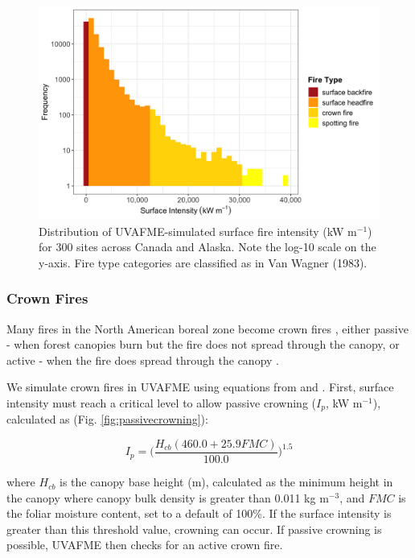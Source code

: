 \documentclass[a4paper, 12pt] {report}
\begin{document}
\begin{figure} 
	\includegraphics[width=\linewidth]{figures/Isurfhist.png}
	\caption{Distribution of UVAFME-simulated surface fire intensity (kW m$^{-1}$) for 300 sites across Canada and Alaska. Note the log-10 scale on the y-axis. Fire type categories are classified as in Van Wagner (1983).}
	\label{fig:intensity}
\end{figure}

\subsubsection{Crown Fires}

Many fires in the North American boreal zone become crown fires \cite{rogersInfluenceTreeSpecies2015},  either passive - when forest canopies burn but the fire does not spread through the canopy, or active - when the fire does spread through the canopy \cite{vanwagnerConditionsStartSpread1977}. 

We simulate crown fires in UVAFME using equations from  and .  First, surface intensity must reach a critical level to allow passive crowning ($I_p$, kW m$^{-1}$), calculated as (Fig. \ref{fig:passivecrowning}):

\begin{equation}
	I_p = \Big(\frac{H_{cb}(460.0 + 25.9FMC)}{100.0}\Big)^{1.5}
\end{equation}

where $H_{cb}$ is the canopy base height (m), calculated as the minimum height in the canopy where canopy bulk density is greater than 0.011 kg m$^{-3}$, and $FMC$ is the foliar moisture content, set to a default of 100\%.  If the surface intensity is greater than this threshold value, crowning can occur.  If passive crowning is possible,  UVAFME then checks for an active crown fire.
\end{document}
